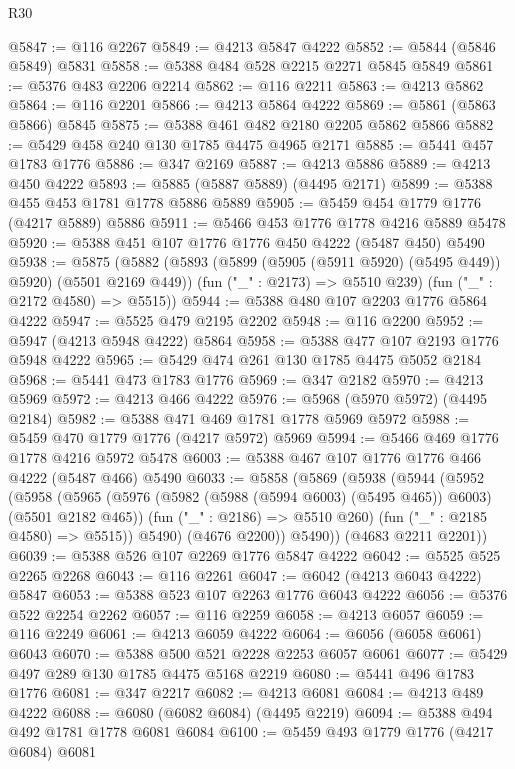 \begin{lexlean}{R30}
\begin{coremodule}
@5847 := @116 @2267
@5849 := @4213 @5847 @4222
@5852 := @5844 (@5846 @5849) @5831
@5858 := @5388 @484 @528 @2215 @2271 @5845 @5849
@5861 := @5376 @483 @2206 @2214
@5862 := @116 @2211
@5863 := @4213 @5862
@5864 := @116 @2201
@5866 := @4213 @5864 @4222
@5869 := @5861 (@5863 @5866) @5845
@5875 := @5388 @461 @482 @2180 @2205 @5862 @5866
@5882 := @5429 @458 @240 @130 @1785 @4475 @4965 @2171
@5885 := @5441 @457 @1783 @1776
@5886 := @347 @2169
@5887 := @4213 @5886
@5889 := @4213 @450 @4222
@5893 := @5885 (@5887 @5889) (@4495 @2171)
@5899 := @5388 @455 @453 @1781 @1778 @5886 @5889
@5905 := @5459 @454 @1779 @1776 (@4217 @5889) @5886
@5911 := @5466 @453 @1776 @1778 @4216 @5889 @5478
@5920 := @5388 @451 @107 @1776 @1776 @450 @4222 (@5487 @450) @5490
@5938 := @5875
    (@5882
      (@5893 (@5899 (@5905 (@5911 @5920) (@5495 @449)) @5920) (@5501 @2169 @449))
      (fun ("_" : @2173) => @5510 @239)
      (fun ("_" : @2172 @4580) => @5515))
@5944 := @5388 @480 @107 @2203 @1776 @5864 @4222
@5947 := @5525 @479 @2195 @2202
@5948 := @116 @2200
@5952 := @5947 (@4213 @5948 @4222) @5864
@5958 := @5388 @477 @107 @2193 @1776 @5948 @4222
@5965 := @5429 @474 @261 @130 @1785 @4475 @5052 @2184
@5968 := @5441 @473 @1783 @1776
@5969 := @347 @2182
@5970 := @4213 @5969
@5972 := @4213 @466 @4222
@5976 := @5968 (@5970 @5972) (@4495 @2184)
@5982 := @5388 @471 @469 @1781 @1778 @5969 @5972
@5988 := @5459 @470 @1779 @1776 (@4217 @5972) @5969
@5994 := @5466 @469 @1776 @1778 @4216 @5972 @5478
@6003 := @5388 @467 @107 @1776 @1776 @466 @4222 (@5487 @466) @5490
@6033 := @5858
    (@5869
      (@5938
        (@5944
          (@5952
            (@5958
              (@5965
                (@5976 (@5982 (@5988 (@5994 @6003) (@5495 @465)) @6003) (@5501 @2182 @465))
                (fun ("_" : @2186) => @5510 @260)
                (fun ("_" : @2185 @4580) => @5515))
              @5490)
            (@4676 @2200))
          @5490))
      (@4683 @2211 @2201))
@6039 := @5388 @526 @107 @2269 @1776 @5847 @4222
@6042 := @5525 @525 @2265 @2268
@6043 := @116 @2261
@6047 := @6042 (@4213 @6043 @4222) @5847
@6053 := @5388 @523 @107 @2263 @1776 @6043 @4222
@6056 := @5376 @522 @2254 @2262
@6057 := @116 @2259
@6058 := @4213 @6057
@6059 := @116 @2249
@6061 := @4213 @6059 @4222
@6064 := @6056 (@6058 @6061) @6043
@6070 := @5388 @500 @521 @2228 @2253 @6057 @6061
@6077 := @5429 @497 @289 @130 @1785 @4475 @5168 @2219
@6080 := @5441 @496 @1783 @1776
@6081 := @347 @2217
@6082 := @4213 @6081
@6084 := @4213 @489 @4222
@6088 := @6080 (@6082 @6084) (@4495 @2219)
@6094 := @5388 @494 @492 @1781 @1778 @6081 @6084
@6100 := @5459 @493 @1779 @1776 (@4217 @6084) @6081

\end{coremodule}
\end{lexlean}
